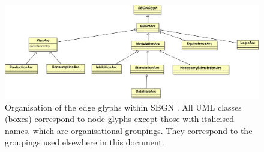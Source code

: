 \begin{figure}[htb!]
\begin{center}
\includegraphics[width=\linewidth]{images/build/sbgn_edge_taxonomy.pdf}
\caption{Organisation of the edge glyphs within SBGN \PDl. All UML classes (boxes) correspond to \PD node glyphs except those with italicised names, which are organisational groupings. They correspond to the groupings used elsewhere in this document.}
\label{fig:sbgn_edge_tax}
\end{center}
\end{figure}


